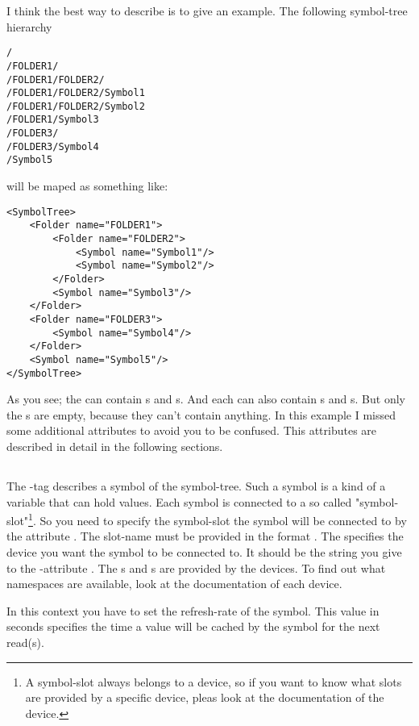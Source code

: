 I think the best way to describe is to give an example. The following symbol-tree hierarchy
\begin{verbatim}
/
/FOLDER1/
/FOLDER1/FOLDER2/
/FOLDER1/FOLDER2/Symbol1
/FOLDER1/FOLDER2/Symbol2
/FOLDER1/Symbol3
/FOLDER3/
/FOLDER3/Symbol4
/Symbol5
\end{verbatim}
will be maped as something like:
\begin{verbatim}
<SymbolTree>
    <Folder name="FOLDER1">
        <Folder name="FOLDER2">
            <Symbol name="Symbol1"/>
            <Symbol name="Symbol2"/>
        </Folder>
        <Symbol name="Symbol3"/>
    </Folder>    
    <Folder name="FOLDER3">
        <Symbol name="Symbol4"/>
    </Folder>
    <Symbol name="Symbol5"/>
</SymbolTree>
\end{verbatim}
As you see; the  can contain s and s. And each  can
also contain s and s. But only the s are empty, because they can't contain
anything. In this example I missed some additional attributes to avoid you to be confused. This attributes are described 
in detail in the following sections.

\subsection{}
The -tag describes a symbol of the symbol-tree. Such a symbol is a kind of a variable that can hold values.
Each symbol is connected to a so called "symbol-slot"\footnote{A symbol-slot always belongs to a device, so if you want to know 
what slots are provided by a specific device, pleas look at the documentation of the device.}. So you need to specify the 
symbol-slot the symbol will be connected to by the attribute . The slot-name must be provided in the format 
. The  specifies the device you want the symbol to be
connected to. It should be the string you give to the -attribute . The s and
s are provided by the devices. To find out what namespaces are available, look at the documentation of 
each device.

In this context you have to set the refresh-rate of the symbol. This value in seconds specifies the time
a value will be cached by the symbol for the next read(s).

